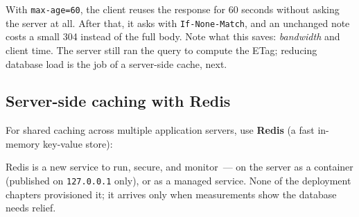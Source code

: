 \noindent{}With \texttt{max-age=60}, the client reuses the response for 60 seconds without asking the server at all. After that, it asks with \texttt{If-None-Match}, and an unchanged note costs a small 304 instead of the full body. Note what this saves: \emph{bandwidth} and client time. The server still ran the query to compute the ETag; reducing database load is the job of a server-side cache, next.

\subsection*{Server-side caching with Redis}\label{36-scaling-load:server-side-caching-with-redis}

For shared caching across multiple application servers, use \textbf{Redis} (a fast in-memory key-value store):

\begin{codebox}[short]

\begin{Shaded}
\begin{Highlighting}[]
\end{Highlighting}
\end{Shaded}

\end{codebox}

\noindent{}Redis is a new service to run, secure, and monitor~--- on the server as a container (published on \texttt{127.0.0.1} only), or as a managed service. None of the deployment chapters provisioned it; it arrives only when measurements show the database needs relief.

